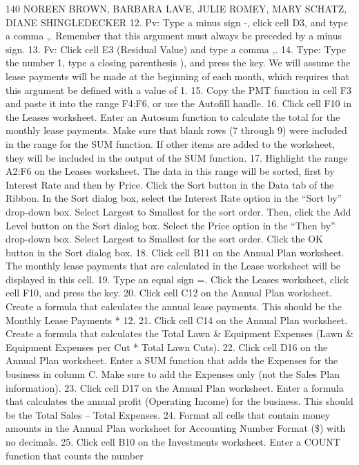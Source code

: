 140 NOREEN BROWN, BARBARA LAVE, JULIE ROMEY, MARY SCHATZ, DIANE SHINGLEDECKER
12. Pv: Type a minus sign -, click cell D3, and type a comma ,. Remember that this argument must
always be preceded by a minus sign.
13. Fv: Click cell E3 (Residual Value) and type a comma ,.
14. Type: Type the number 1, type a closing parenthesis ), and press the  key. We will assume
the lease payments will be made at the beginning of each month, which requires that this
argument be defined with a value of 1.
15. Copy the PMT function in cell F3 and paste it into the range F4:F6, or use the Autofill handle.
16. Click cell F10 in the Leases worksheet. Enter an Autosum function to calculate the total for the
monthly lease payments. Make sure that blank rows (7 through 9) were included in the range for
the SUM function. If other items are added to the worksheet, they will be included in the output
of the SUM function.
17. Highlight the range A2:F6 on the Leases worksheet. The data in this range will be sorted, first by
Interest Rate and then by Price. Click the Sort button in the Data tab of the Ribbon. In the Sort
dialog box, select the Interest Rate option in the “Sort by” drop-down box. Select Largest to
Smallest for the sort order. Then, click the Add Level button on the Sort dialog box. Select the
Price option in the “Then by” drop-down box. Select Largest to Smallest for the sort order. Click
the OK button in the Sort dialog box.
18. Click cell B11 on the Annual Plan worksheet. The monthly lease payments that are calculated
in the Lease worksheet will be displayed in this cell.
19. Type an equal sign =. Click the Leases worksheet, click cell F10, and press the  key.
20. Click cell C12 on the Annual Plan worksheet. Create a formula that calculates the annual lease
payments. This should be the Monthly Lease Payments * 12.
21. Click cell C14 on the Annual Plan worksheet. Create a formula that calculates the Total Lawn \&
Equipment Expenses (Lawn \& Equipment Expenses per Cut * Total Lawn Cuts).
22. Click cell D16 on the Annual Plan worksheet. Enter a SUM function that adds the Expenses for
the business in column C. Make sure to add the Expenses only (not the Sales Plan information).
23. Click cell D17 on the Annual Plan worksheet. Enter a formula that calculates the annual profit
(Operating Income) for the business. This should be the Total Sales – Total Expenses.
24. Format all cells that contain money amounts in the Annual Plan worksheet for Accounting
Number Format (\$) with no decimals.
25. Click cell B10 on the Investments worksheet. Enter a COUNT function that counts the number
